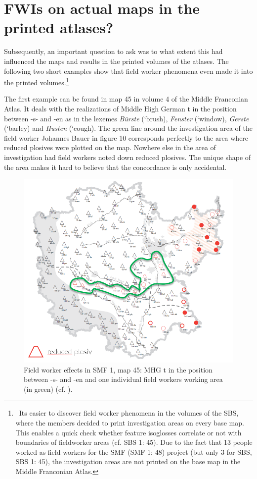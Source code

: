 \documentclass[output=paper]{LSP/langsci}
\begin{document}
\section{FWIs on actual maps in the printed atlases?}
Subsequently, an important question to ask was to what extent this had influenced the maps and results in the printed volumes of the atlases. The following two short examples show that field worker phenomena even made it into the printed volumes.\footnote{\ It{\textquotesingle}s easier to discover field worker phenomena in the volumes of the SBS, where the members decided to print investigation areas on every base map. This enables a quick check whether feature isoglosses correlate or not with boundaries of fieldworker areas (cf. SBS 1: 45). Due to the fact that 13 people worked as field workers for the SMF (SMF 1: 48) project (but only 3 for SBS, SBS 1: 45), the investigation areas are not printed on the base map in the Middle Franconian Atlas.}

The first example can be found in map 45 in volume 4 of the Middle Franconian Atlas. It deals with the realizations of Middle High German t in the position between -s- and -en as in the lexemes \textit{Bürste} (`brush{\textquotesingle}), \textit{Fenster} (`window{\textquotesingle}), \textit{Gerste} (`barley{\textquotesingle}) and \textit{Husten} (`cough{\textquotesingle}). The green line around the investigation area of the field worker Johannes Bauer in figure 10 corresponds perfectly to the area where reduced plosives were plotted on the map. Nowhere else in the area of investigation had field workers noted down reduced plosives. The unique shape of the area makes it hard to believe that the concordance is only accidental.

\begin{figure}
\includegraphics[width=.7\textwidth]{illustrations/mathus_fig11}
\caption{Field worker effects in SMF 1, map 45: MHG t in the position between -s- and -en and one individual field worker{\textquotesingle}s working area (in green) (cf. \citealt[240]{mathussek_sprachraume_2014}).}
\label{fig:11}
\end{figure}
\end{document}
